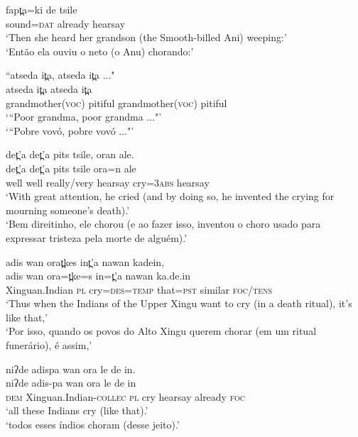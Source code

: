 \documentclass[output=paper,
modfonts,nonflat
]{langsci/langscibook}
\begin{document}
\gll fapt̪a=ki        de         tsile\\
sound=\textsc{dat}   already hearsay\\
\glt `Then she heard her grandson (the Smooth-billed Ani) weeping:'\\
‘Então ela ouviu o neto (o Anu) chorando:’
\z

\ea “atseda it̪a, atseda it̪a ..."\\[.3em]
\gll atseda   it̪a   atseda    it̪a\\
grandmother(\textsc{voc})   pitiful   grandmother(\textsc{voc})   pitiful\\   
\glt ‘“Poor grandma, poor grandma ..."'\\
‘“Pobre vovó, pobre vovó ..."'{\footnotemark} 

\z

\ea det̪'a det̪'a pits tsile, oran ale.\\[.3em]
\gll det̪'a  det̪'a  pits  tsile ora=n  ale\\
well  well  really/very  hearsay  cry=\textsc{3abs}  hearsay\\
\glt `With great attention, he cried (and by doing so, he invented the crying for mourning someone's death).'\\
‘Bem direitinho, ele chorou (e ao fazer isso, inventou o choro usado para expressar tristeza pela morte de alguém).’
\z

\ea adis wan orat̪kes int̪'a nawan kadein,\\[.3em] 
\gll adis  wan   ora=t̪ke=s  in=t̪'a  nawan  ka.de.in\\    
Xinguan.Indian  \textsc{pl} cry=\textsc{des}=\textsc{temp}    that=\textsc{pst}  similar \textsc{foc/tens}\\   
\glt `Thus when the Indians of the Upper Xingu want to cry (in a death ritual), it's like that,'\\
‘Por isso, quando os povos do Alto Xingu querem chorar (em um ritual funerário), é assim,’
\z

\ea niʔde adispa wan ora le de in.\\[.3em]
\gll niʔde  adis-pa wan  ora   le  de  in\\
\textsc{dem}   Xinguan.Indian-\textsc{collec}  \textsc{pl}  cry   hearsay already \textsc{foc}\\
\glt `all these Indians cry (like that).'\\
‘todos esses índios choram (desse jeito).’
\z 
\end{document}
